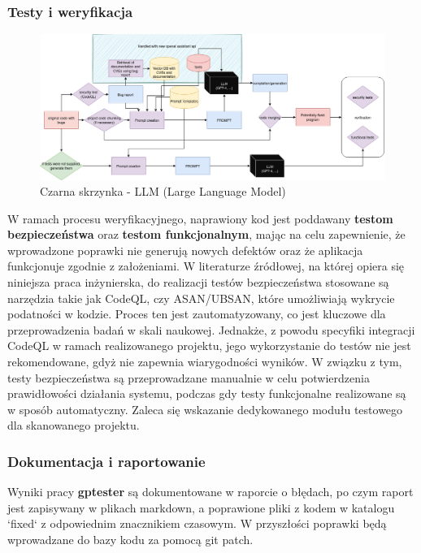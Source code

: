 \subsubsection{Testy i weryfikacja}
\begin{figure}[h]
    \centering
    \includegraphics[clip, trim=25cm 2cm 0cm 4cm, width=0.9\linewidth]{img/gptester.drawio.png}
    \caption{Czarna skrzynka - LLM (Large Language Model)}
    \label{fig:przyciety_obraz2}
\end{figure}
W ramach procesu weryfikacyjnego, naprawiony kod jest poddawany \textbf{testom bezpieczeństwa} oraz \textbf{testom funkcjonalnym}, mając na celu zapewnienie, że wprowadzone poprawki nie generują nowych defektów oraz że aplikacja funkcjonuje zgodnie z założeniami. W literaturze źródłowej, na której opiera się niniejsza praca inżynierska, do realizacji testów bezpieczeństwa stosowane są narzędzia takie jak CodeQL, czy ASAN/UBSAN, które umożliwiają wykrycie podatności w kodzie. Proces ten jest zautomatyzowany, co jest kluczowe dla przeprowadzenia badań w skali naukowej. Jednakże, z powodu specyfiki integracji CodeQL w ramach realizowanego projektu, jego wykorzystanie do testów nie jest rekomendowane, gdyż nie zapewnia wiarygodności wyników. W związku z tym, testy bezpieczeństwa są przeprowadzane manualnie w celu potwierdzenia prawidłowości działania systemu, podczas gdy testy funkcjonalne realizowane są w sposób automatyczny. 
Zaleca się wskazanie dedykowanego modułu testowego dla skanowanego projektu.
\subsubsection{Dokumentacja i raportowanie}
Wyniki pracy \textbf{gptester} są dokumentowane w raporcie o błędach, po czym raport jest zapisywany w plikach markdown, a poprawione pliki z kodem w katalogu `fixed` z odpowiednim znacznikiem czasowym. W przyszłości poprawki będą wprowadzane do bazy kodu za pomocą git patch.

